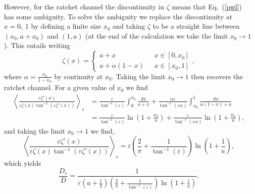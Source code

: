 \documentclass[pre,showpacs,preprintnumbers,amsmath,amssymb,superscriptaddress]{revtex4-1}
\begin{document}
{{However, for the ratchet channel the discontinuity in $\zeta$ means that Eq.~(\ref{pwl}) has some ambiguity. To solve the ambiguity we replace the discontinuity at $x=0,\ 1$ by defining 
a finite size $x_0$ and taking $\zeta$ to be a straight line between $(x_0, a+x_0)$ and $(1,a)$ (at the end of the calculation we take the limit $x_0\to 1$). This entails writing
\begin{equation}
\zeta(x)=
\begin{cases}
a+x ~~~&x\in[0,x_0] \\
a+\alpha(1-x) ~~~&x\in[x_0,1]
\end{cases},
\end{equation}
where $\alpha=\frac{x_0}{1-x_0}$ by continuity at $x_0$. Taking the limit $x_0 \to 1$ then recovers the ratchet channel. For a given value of $x_0$ we find
\begin{equation}
\begin{split}
\left\langle\frac{ \varepsilon\zeta'(x)}{\varepsilon\zeta(x)\tan^{-1}(\varepsilon \zeta'(x))}\right\rangle_s &= \frac{\varepsilon}{\tan^{-1}(\varepsilon)} \int_0^{x_0} \frac{dx}{a+x} + \frac{\alpha\varepsilon}{\tan^{-1}(\varepsilon \alpha)} \int_{x_0}^1 \frac{ dx}{\alpha(1-x)+a} \\
&= \frac{\varepsilon}{\tan^{-1}(\varepsilon)} \ln\left(1+\frac{x_0}{a}\right) + \frac{\varepsilon}{\tan^{-1}(\varepsilon \alpha)} \ln\left(1+\frac{x_0}{a}\right),
\end{split}
\end{equation} 
and taking the limit $x_0\to 1$ we find,
\begin{equation}
\left\langle \frac{ \varepsilon\zeta'(x)}{\varepsilon\zeta(x)\tan^{-1}(\varepsilon \zeta'(x))}\right\rangle_s=\varepsilon \left(\frac{2}{\pi} + \frac{1}{\tan^{-1}(\varepsilon)}\right) \ln\left(1+\frac{1}{a}\right),
\end{equation}
which yields
\begin{equation}
\label{lin2kp}
\frac{D_e}{D} = \frac{1}{\varepsilon \left(a+\frac{1}{2}\right) \left(\frac{2}{\pi} + \frac{1}{\tan^{-1}(\varepsilon)}\right) \ln\left(1+\frac{1}{a}\right)}.
\end{equation}

}}
\end{document}
